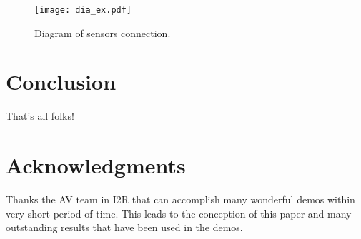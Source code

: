 \documentclass[10 pt,letterpaper,conference]{IEEEtran}
\begin{document}
\begin{figure}[!t]
\centering
\texttt{[image: dia\_ex.pdf]}
\caption{Diagram of sensors connection.}
\label{dia_ex}
\end{figure}

\section{Conclusion}\label{conclusion}

That's all folks!

\section*{Acknowledgments}\label{acknowledgments}

Thanks the AV team in I2R that can accomplish many wonderful demos
within very short period of time. This leads to the conception of this
paper and many outstanding results that have been used in the demos.

                                    \renewcommand\refname{References}
                        

    
\end{document}
